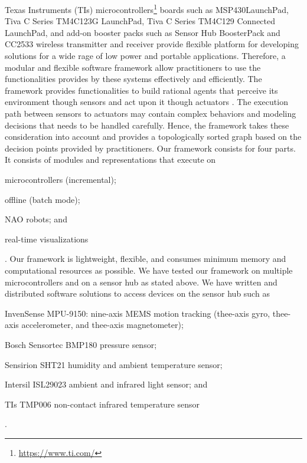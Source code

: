 \documentclass[letterpaper]{article}
\begin{document}
Texas Instruments (TIs) microcontrollers\footnote{\url{https://www.ti.com/}}  boards such 
as MSP430{\texttrademark}LaunchPad, Tiva{\texttrademark} C Series TM4C123G
LaunchPad, Tiva C Series 
TM4C129 Connected LaunchPad, and add-on booster packs such as Sensor Hub BoosterPack and CC2533 
wireless transmitter and 
receiver  provide flexible platform for developing solutions for a wide rage of low power 
and portable applications. 
Therefore, a modular and flexible software framework allow practitioners to use the functionalities 
provides by these systems effectively and efficiently. The framework provides functionalities to 
build  rational agents that perceive its environment though sensors and act upon it though actuators 
\cite{russel2009}. The execution path between sensors to actuators may contain complex behaviors and 
modeling decisions that needs to be handled carefully. Hence, the framework takes these 
consideration into account and provides a topologically sorted graph based on the decision points 
provided by practitioners. Our framework consists for four parts. It consists of modules and 
representations that execute on \begin{inparaenum}[(1)]\item microcontrollers (incremental); \item 
offline (batch mode); \item NAO robots; and \item real-time visualizations\end{inparaenum}. Our 
framework is lightweight, flexible, and consumes minimum memory and computational resources as 
possible. We have tested our framework on multiple microcontrollers and on a sensor hub as stated 
above. We have written and distributed  software solutions to access devices on the sensor hub such 
as \begin{inparaenum}[(1)] \item InvenSense MPU-9150: nine-axis MEMS motion tracking (thee-axis 
gyro, thee-axis accelerometer, and thee-axis magnetometer); \item Bosch Sensortec BMP180 pressure 
sensor; \item Sensirion SHT21 humidity and ambient temperature sensor; \item Intersil ISL29023 
ambient and infrared light sensor; and \item TIs TMP006 non-contact infrared temperature 
sensor\end{inparaenum}.
\end{document}
